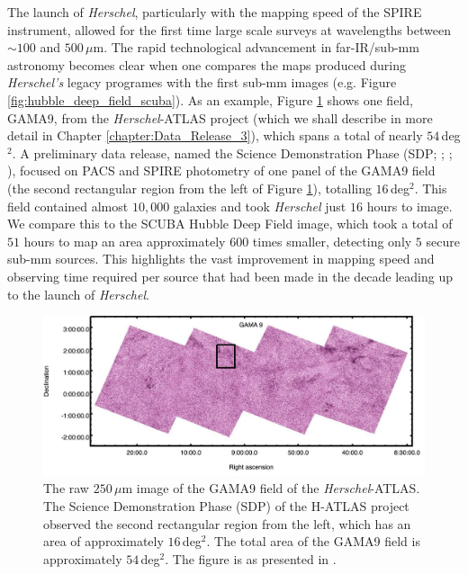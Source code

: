 The launch of \textit{Herschel}, particularly with the mapping speed of the SPIRE instrument, allowed for the first time large scale surveys at wavelengths between $\sim 100$ and $500\,\mu$m. The rapid technological advancement in far-IR/sub-mm astronomy becomes clear when one compares the maps produced during \textit{Herschel's} legacy programes with the first sub-mm images (e.g. Figure \ref{fig:hubble_deep_field_scuba}). As an example, Figure \ref{fig:gama9} shows one field, GAMA9, from the \textit{Herschel}-ATLAS project (which we shall describe in more detail in Chapter \ref{chapter:Data_Release_3}), which spans a total of nearly $54\,$deg$^2$. A preliminary data release, named the Science Demonstration Phase (SDP; \citealt{Ibar_2010}; \citealt{Rigby_2011}; \citealt{Pascale_2011}), focused on PACS and SPIRE photometry of one panel of the GAMA9 field (the second rectangular region from the left of Figure \ref{fig:gama9}), totalling $16\,$deg$^2$. This field contained almost $10,000$ galaxies and took \textit{Herschel} just $16$ hours to image. We compare this to the SCUBA Hubble Deep Field image, which took a total of $51$ hours to map an area approximately $600$ times smaller, detecting only $5$ secure sub-mm sources. This highlights the vast improvement in mapping speed and observing time required per source that had been made in the decade leading up to the launch of \textit{Herschel}.

\begin{figure}
    \centering
	\includegraphics[width=0.9\columnwidth]{Figures/GAMA9.pdf}
	\caption[$250\,\mu$m map of the GAMA9 field of H-ATLAS]{The raw $250\,\mu$m image of the GAMA9 field of the \textit{Herschel}-ATLAS. The Science Demonstration Phase (SDP) of the H-ATLAS project observed the second rectangular region from the left, which has an area of approximately $16\,$deg$^2$. The total area of the GAMA9 field is approximately $54\,$deg$^2$. The figure is as presented in \citealt{Valiante_2016}.}
	\label{fig:gama9}
\end{figure}


